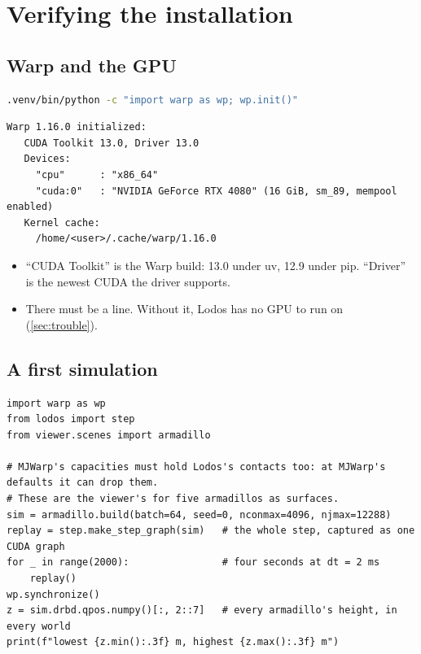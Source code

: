 \section{Verifying the installation}\label{sec:verify}

\subsection{Warp and the GPU}\label{sec:gpu}

\begin{lstlisting}[language=bash]
.venv/bin/python -c "import warp as wp; wp.init()"
\end{lstlisting}

\begin{lstlisting}[language={}]
Warp 1.16.0 initialized:
   CUDA Toolkit 13.0, Driver 13.0
   Devices:
     "cpu"      : "x86_64"
     "cuda:0"   : "NVIDIA GeForce RTX 4080" (16 GiB, sm_89, mempool enabled)
   Kernel cache:
     /home/<user>/.cache/warp/1.16.0
\end{lstlisting}

\begin{itemize}
\item ``CUDA Toolkit'' is the Warp build: 13.0 under uv, 12.9 under pip. ``Driver'' is the newest CUDA the driver supports.
\item There must be a  line. Without it, Lodos has no GPU to run on (\cref{sec:trouble}).
\end{itemize}

\subsection{A first simulation}\label{sec:first}

\begin{lstlisting}
import warp as wp
from lodos import step
from viewer.scenes import armadillo

# MJWarp's capacities must hold Lodos's contacts too: at MJWarp's defaults it can drop them.
# These are the viewer's for five armadillos as surfaces.
sim = armadillo.build(batch=64, seed=0, nconmax=4096, njmax=12288)
replay = step.make_step_graph(sim)   # the whole step, captured as one CUDA graph
for _ in range(2000):                # four seconds at dt = 2 ms
    replay()
wp.synchronize()
z = sim.drbd.qpos.numpy()[:, 2::7]   # every armadillo's height, in every world
print(f"lowest {z.min():.3f} m, highest {z.max():.3f} m")
\end{lstlisting}

